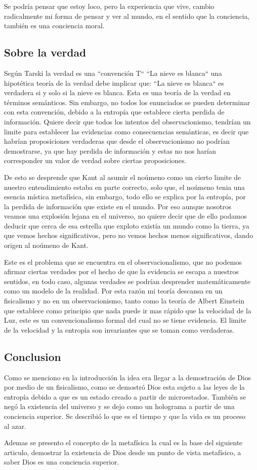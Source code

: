 \documentclass[12pt,letterpaper, a4paper ]{article}
\begin{document}
Se podría pensar que estoy loco, pero la experiencia que vive, cambio radicalmente mi forma de pensar y ver al mundo, en el sentido que la conciencia, también es una conciencia moral.

\subsection{Sobre la verdad}

Según Tarski la verdad es una ``convención T``  ``La nieve es blanca`` una hipotética teoría de la verdad debe implicar que: ``La nieve es blanca`` es verdadera si y solo si la nieve es blanca.  Esta es una teoría de la verdad en términos semánticos. Sin embargo, no todos los enunciados se pueden determinar con esta convención, debido a la entropía que establece cierta perdida de información. Quiere decir que todos los intentos del observacionismo, tendrían un limite para establecer las evidencias como consecuencias semánticas, es decir que habrían proposiciones verdaderas que desde el observacionismo no podrían demostrarse, ya que hay perdida de información y estas no nos harían corresponder un valor de verdad sobre ciertas proposiciones. 

De esto se desprende que Kant al asumir el noúmeno como un cierto limite de nuestro entendimiento estaba en parte correcto, solo que, el noúmeno tenia una esencia mística metafísica, sin embargo, todo ello se explica por la entropía, por la perdida de información que existe en el mundo. Por eso aunque nosotros veamos una explosión lejana en el universo, no quiere decir que de ello podamos deducir que cerca de esa estrella que exploto existía un mundo como la tierra, ya que vemos hechos significativos, pero no vemos hechos menos significativos, dando origen al noúmeno de Kant.

Este es el problema que se encuentra en el observacionalismo, que no podemos afirmar ciertas verdades por el hecho de que la evidencia se escapa a nuestros sentidos, en todo caso, algunas verdades se podrían desprender matemáticamente como un modelo de la realidad. Por esta razón mi teoría descansa en un fisicalismo y no en un observacionismo, tanto como la teoría de Albert Einstein que establece como principio que nada puede ir mas rápido que la velocidad de la Luz, este es un convencionalismo formal del cual no se tiene evidencia. El limite de la velocidad y la entropía son invariantes que se toman como verdaderas.


\subsection{Conclusion}
Como se menciono en la introducción la idea era llegar a la demostración de Dios por medio de un fisicalismo, como se demostró Dios esta sujeto a las leyes de la entropía debido a que es un estado creado a partir de microestados. También se negó la existencia del universo y se dejo como un holograma a partir de una conciencia superior. Se describió lo que es el tiempo y que la vida es un proceso al azar.

Ademas se presento el concepto de la metafísica la cual es la base del siguiente articulo, demostrar la existencia de Dios desde un punto de vista metafísico, a saber Dios es una conciencia superior.
\end{document}
